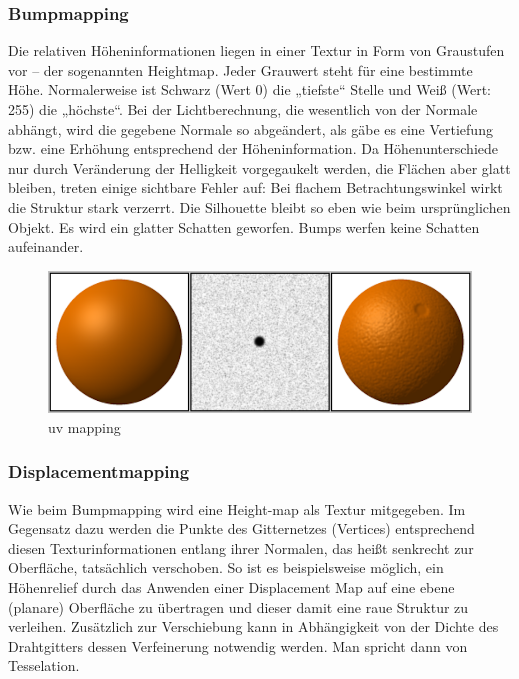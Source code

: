 \subsubsection{Bumpmapping}
Die relativen Höheninformationen liegen in einer Textur in Form von Graustufen vor – der sogenannten Heightmap. Jeder Grauwert steht für eine bestimmte Höhe. Normalerweise ist Schwarz (Wert 0) die „tiefste“ Stelle und Weiß (Wert: 255) die „höchste“.  Bei der Lichtberechnung, die wesentlich von der Normale abhängt, wird die gegebene Normale so abgeändert, als gäbe es eine Vertiefung bzw. eine Erhöhung entsprechend der Höheninformation.  Da Höhenunterschiede nur durch Veränderung der Helligkeit vorgegaukelt werden, die Flächen aber glatt bleiben, treten einige sichtbare Fehler auf:
Bei flachem Betrachtungswinkel wirkt die Struktur stark verzerrt.
Die Silhouette bleibt so eben wie beim ursprünglichen Objekt.
Es wird ein glatter Schatten geworfen.
Bumps werfen keine Schatten aufeinander.

\begin{figure}[H]
    \centering
    \includegraphics[width=1.0\textwidth]{images/Bumpmap.png}
    \caption{uv mapping} %
    \label{fig:uv-mapping3}
\end{figure}




\subsubsection{Displacementmapping}
Wie beim Bumpmapping  wird  eine Height-map als Textur mitgegeben.
Im Gegensatz dazu werden die Punkte des Gitternetzes (Vertices)  entsprechend diesen Texturinformationen entlang ihrer Normalen, das heißt senkrecht zur Oberfläche, tatsächlich verschoben. So ist es beispielsweise möglich, ein Höhenrelief durch das Anwenden einer Displacement Map auf eine ebene (planare) Oberfläche zu übertragen und dieser damit eine raue Struktur zu verleihen. Zusätzlich zur Verschiebung kann in Abhängigkeit von der Dichte des Drahtgitters dessen Verfeinerung notwendig werden. Man spricht dann von Tesselation.

